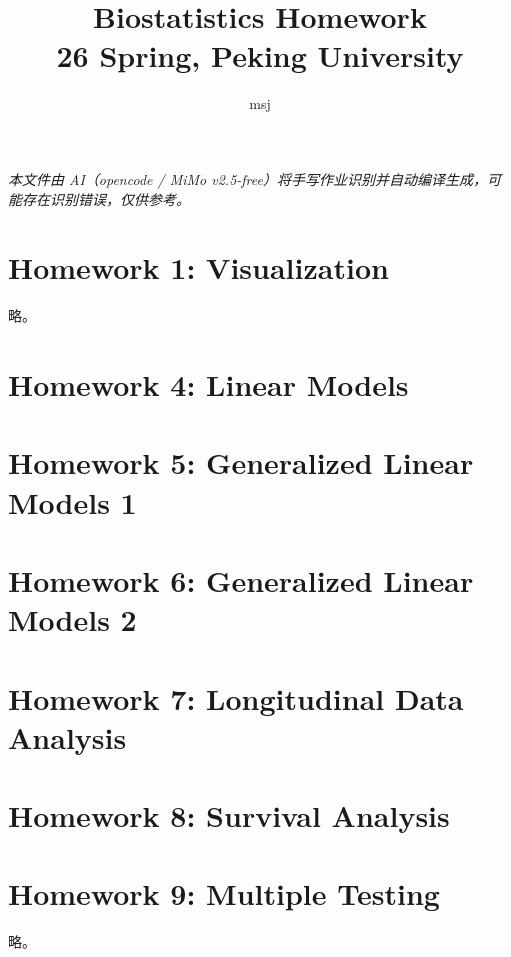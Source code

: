 \documentclass[10pt,a4paper]{article}
\title{\textbf{Biostatistics Homework} \\ \small 26 Spring, Peking University}
\author{msj}
\date{}
\begin{document}
\maketitle

\begin{center}
\footnotesize
\textit{本文件由 AI（opencode / MiMo v2.5-free）将手写作业识别并自动编译生成，可能存在识别错误，仅供参考。}
\end{center}

\newpage
\tableofcontents
\newpage

\section{Homework 1: Visualization}
略。

\newpage



\newpage



\newpage

\section{Homework 4: Linear Models}


\newpage

\section{Homework 5: Generalized Linear Models 1}


\newpage

\section{Homework 6: Generalized Linear Models 2}


\newpage

\section{Homework 7: Longitudinal Data Analysis}


\newpage

\section{Homework 8: Survival Analysis}


\newpage

\section{Homework 9: Multiple Testing}
略。
\end{document}
